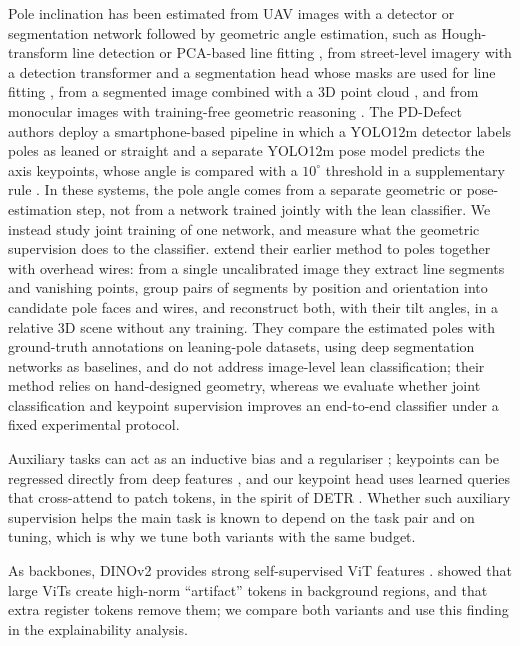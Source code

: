 \documentclass[11pt]{article}
\begin{document}
Pole inclination has been estimated from UAV images with a detector or segmentation network followed by
geometric angle estimation, such as Hough-transform line detection or PCA-based line fitting \citep{alam2020resilience,luo2026pole}, from
street-level imagery with a detection transformer and a segmentation head whose masks are used for line fitting
\citep{dickinson2025pole}, from a segmented image combined with a 3D point cloud \citep{chen2023inclination},
and from monocular images with training-free geometric reasoning
\citep{wang2024leaning,wang2026overheadwires}. The PD-Defect authors deploy a smartphone-based pipeline in
which a YOLO12m detector labels poles as leaned or straight and a separate YOLO12m pose model predicts the axis
keypoints, whose angle is compared with a $10^\circ$ threshold in a supplementary rule
\citep{masabathula2026smartphone}. In these systems, the pole angle comes from a separate geometric or
pose-estimation step, not from a network trained jointly with the lean classifier. We instead study joint
training of one network, and measure what the geometric supervision does to the classifier.
\citet{wang2026overheadwires} extend their earlier method to poles together with overhead wires: from a single
uncalibrated image they extract line segments and vanishing points, group pairs of segments by position and
orientation into candidate pole faces and wires, and reconstruct both, with their tilt angles, in a relative
3D scene without any training. They compare the estimated poles with ground-truth annotations on leaning-pole
datasets, using deep segmentation networks as baselines, and do not address image-level lean classification;
their method relies on hand-designed geometry, whereas we evaluate whether joint classification and keypoint
supervision improves an end-to-end classifier under a fixed experimental protocol.

Auxiliary tasks can act as an inductive bias and a regulariser \citep{caruana1997multitask,ruder2017overview};
keypoints can be regressed directly from deep features \citep{toshev2014deeppose}, and our
keypoint head uses learned queries that cross-attend to patch tokens, in the spirit of
DETR \citep{carion2020detr}. Whether such auxiliary supervision helps the main task is known to depend on the
task pair and on tuning, which is why we tune both variants with the same budget.

As backbones, DINOv2 \citep{oquab2024dinov2} provides strong self-supervised ViT features \citep{dosovitskiy2021vit}.
\citet{darcet2024registers} showed that large ViTs create high-norm ``artifact'' tokens in background
regions, and that extra register tokens remove them; we compare both variants and use this finding in the
explainability analysis.
\end{document}
